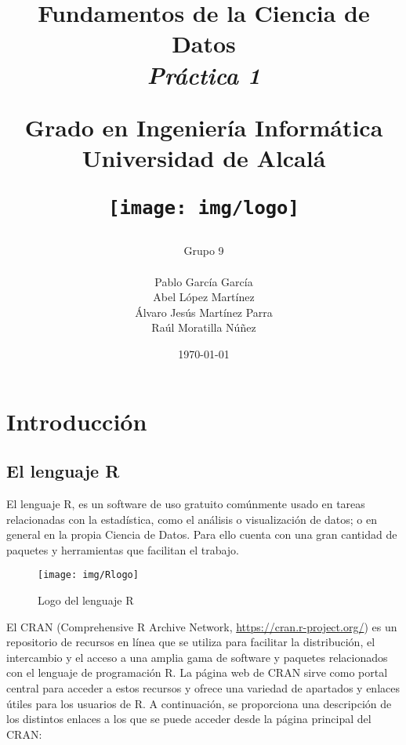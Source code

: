 \documentclass[12pt]{report}\usepackage[]{graphicx}\usepackage[dvipsnames]{xcolor}
\title{
	\huge
	\noindent\textbf{Fundamentos de la Ciencia de Datos}\\
	
	{\Large \textit{Práctica 1}}
	\vspace{1cm}
	
	\huge
	Grado en Ingeniería Informática\\
	Universidad de Alcalá\\
	
	\vspace{1cm}
	
	\texttt{[image: img/logo]}
}
\author{
	Grupo 9\\\\
	Pablo García García\\
	Abel López Martínez\\
	Álvaro Jesús Martínez Parra\\
	Raúl Moratilla Núñez
}
\date{
	\large{\today}
}
\begin{document}
	
	\renewcommand{\chaptername}{Parte}
	\renewcommand{\lstlistingname}{Código}
	\maketitle \thispagestyle{empty}
	
	\newpage
	
	\setcounter{tocdepth}{3}
	\tableofcontents
	\listoffigures
	
	\chapter*{Introducción}\pagestyle{plain}
	
		\section*{El lenguaje R}
		
			El lenguaje R, es un software de uso gratuito comúnmente usado en tareas relacionadas con la estadística, como el análisis o visualización de datos; o en general en la propia Ciencia de Datos. Para ello cuenta con una gran cantidad de paquetes y herramientas que facilitan el trabajo.   
			
			\begin{figure}[H]
				\centering
				\texttt{[image: img/Rlogo]}
				\caption{Logo del lenguaje R}
				\label{fig:logo_R}
			\end{figure}
		
			El CRAN (Comprehensive R Archive Network, \url{https://cran.r-project.org/}) es un repositorio de recursos en línea que se utiliza para facilitar la distribución, el intercambio y el acceso a una amplia gama de software y paquetes relacionados con el lenguaje de programación R. La página web de CRAN sirve como portal central para acceder a estos recursos y ofrece una variedad de apartados y enlaces útiles para los usuarios de R. A continuación, se proporciona una descripción de los distintos enlaces a los que se puede acceder desde la página principal del CRAN:
			
\end{document}
